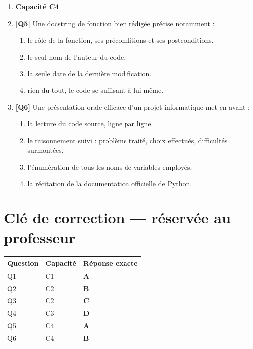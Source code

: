 \begin{enumerate}
\item[] \textbf{Capacité C4}

\item \textbf{[Q5]} Une docstring de fonction bien rédigée précise notamment :
  \begin{enumerate}[label=\Alph*.]
    \item le rôle de la fonction, ses préconditions et ses postconditions.
    \item le seul nom de l'auteur du code.
    \item la seule date de la dernière modification.
    \item rien du tout, le code se suffisant à lui-même.
  \end{enumerate}

\item \textbf{[Q6]} Une présentation orale efficace d'un projet informatique met en avant :
  \begin{enumerate}[label=\Alph*.]
    \item la lecture du code source, ligne par ligne.
    \item le raisonnement suivi : problème traité, choix effectués, difficultés surmontées.
    \item l'énumération de tous les noms de variables employés.
    \item la récitation de la documentation officielle de Python.
  \end{enumerate}

\end{enumerate}

\ifnxVersionProfesseur
\clearpage
\section*{Clé de correction — réservée au professeur}

\begin{center}
\begin{tabular}{lll}
\hline
Question & Capacité & Réponse exacte \\
\hline
Q1 & C1 & \textbf{A} \\
Q2 & C2 & \textbf{B} \\
Q3 & C2 & \textbf{C} \\
Q4 & C3 & \textbf{D} \\
Q5 & C4 & \textbf{A} \\
Q6 & C4 & \textbf{B} \\
\hline
\end{tabular}
\end{center}

